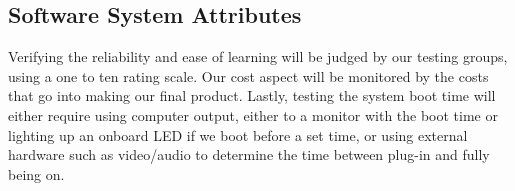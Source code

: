 \subsection{Software System Attributes}
Verifying the reliability and ease of learning will be judged by our testing groups, using a one to ten rating scale. Our cost aspect will be monitored by the costs that go into making our final product. Lastly, testing the system boot time will either require using computer output, either to a monitor with the boot time or lighting up an onboard LED if we boot before a set time, or using external hardware such as video/audio to determine the time between plug-in and fully being on.


